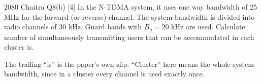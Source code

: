 \hr

{\color{sub}\footnotesize {} }

\begin{asked}{2080 Chaitra \textperiodcentered{} Q8(b) \textperiodcentered{} [4]}
In the N-TDMA system, it uses one way bandwidth of 25 MHz for the forward (or reverse) channel.
The system bandwidth is divided into radio channels of 30 kHz. Guard bands with
$B_g = 20$ kHz are used. Calculate number of simultaneously transmitting users that can be
accommodated in each cluster is.
\par\vspace{1pt}
{\color{sub}The trailing ``is'' is the paper's own slip. ``Cluster'' here means the whole
system bandwidth, since in a cluster every channel is used exactly once.}
\end{asked}


